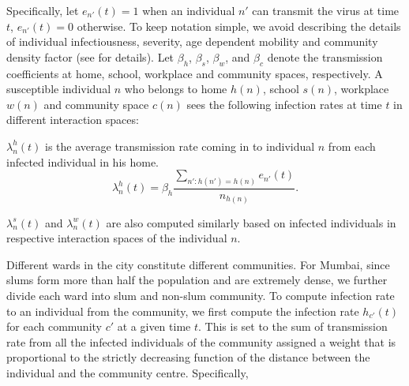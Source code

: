 \documentclass{article}
\theoremstyle{definition}
\begin{document}
 Specifically, let $e_{n'}(t) = 1$ when an individual $n'$ can transmit the virus at time $t$, $e_{n'}(t) = 0$ otherwise. To keep notation simple, we avoid describing the details of individual infectiousness, severity, age dependent mobility and community density factor (see \cite{City_Simulator_IISc_TIFR_2020} for details). Let $\beta_h$, $\beta_s$, $\beta_w$, and $\beta_c$  denote the transmission coefficients at home, school, workplace and  community spaces, respectively. A susceptible individual $n$ who belongs to home $h(n)$, school $s(n)$, workplace $w(n)$ and community space $c(n)$ sees the following infection rates at time $t$ in different interaction spaces:
 

     $\lambda_n^{h}(t)$ is the average transmission rate coming in to individual $n$ from each infected individual in his home. 
     \[\lambda_n^{h}(t)=\beta_{h}   \frac{\sum_{n' : h(n') = h(n)} e_{n'}(t)}{n_{h(n)}}.   \]
    
     $\lambda_n^{s}(t)$ and $\lambda_n^{w}(t)$  are also computed similarly based on infected individuals in respective interaction spaces of the individual $n$. 
    

  
  Different wards in the city constitute different communities. For Mumbai, since slums form more than half the population
 and are extremely dense, we further divide each ward into slum and non-slum community.
 To compute infection rate to an individual from the community, we first compute the infection rate $h_{c'}(t)$ for each community $c'$ at a given time $t$.
 This is set to the 
 sum of transmission rate from all the infected individuals of the community assigned a weight that is
 proportional to the strictly decreasing function of the distance between the individual and the community centre. Specifically,
   
\end{document}
